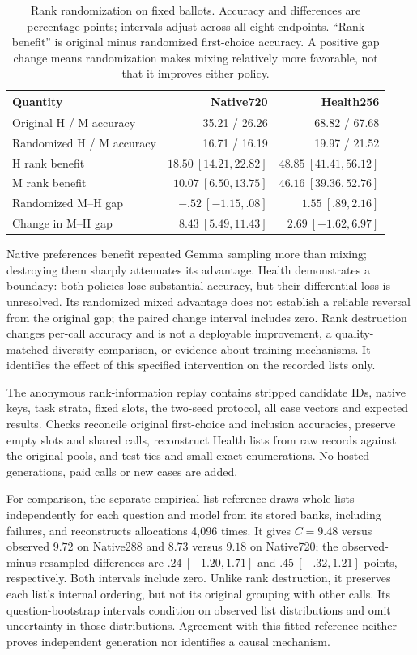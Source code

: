 \begin{table}[h]
\centering\small
\caption{Rank randomization on fixed ballots. Accuracy and differences are percentage points; intervals adjust across all eight endpoints. ``Rank benefit'' is original minus randomized first-choice accuracy. A positive gap change means randomization makes mixing relatively more favorable, not that it improves either policy.}
\label{tab:rank_information}
\begin{tabular}{lrr}
\toprule
Quantity & Native720 & Health256\\
\midrule
Original H / M accuracy &35.21 / 26.26&68.82 / 67.68\\
Randomized H / M accuracy &16.71 / 16.19&19.97 / 21.52\\
H rank benefit & $18.50\ [14.21,22.82]$ & $48.85\ [41.41,56.12]$\\
M rank benefit & $10.07\ [6.50,13.75]$ & $46.16\ [39.36,52.76]$\\
Randomized M--H gap & $-.52\ [-1.15,.08]$ & $1.55\ [.89,2.16]$\\
Change in M--H gap & $8.43\ [5.49,11.43]$ & $2.69\ [-1.62,6.97]$\\
\bottomrule
\end{tabular}
\end{table}

Native preferences benefit repeated Gemma sampling more than mixing; destroying them sharply attenuates its advantage. Health demonstrates a boundary: both policies lose substantial accuracy, but their differential loss is unresolved. Its randomized mixed advantage does not establish a reliable reversal from the original gap; the paired change interval includes zero. Rank destruction changes per-call accuracy and is not a deployable improvement, a quality-matched diversity comparison, or evidence about training mechanisms. It identifies the effect of this specified intervention on the recorded lists only.

The anonymous rank-information replay contains stripped candidate IDs, native keys, task strata, fixed slots, the two-seed protocol, all case vectors and expected results. Checks reconcile original first-choice and inclusion accuracies, preserve empty slots and shared calls, reconstruct Health lists from raw records against the original pools, and test ties and small exact enumerations. No hosted generations, paid calls or new cases are added.

For comparison, the separate empirical-list reference draws whole lists independently for each question and model from its stored banks, including failures, and reconstructs allocations 4,096 times. It gives $C=9.48$ versus observed $9.72$ on Native288 and $8.73$ versus $9.18$ on Native720; the observed-minus-resampled differences are $.24\ [-1.20,1.71]$ and $.45\ [-.32,1.21]$ points, respectively. Both intervals include zero. Unlike rank destruction, it preserves each list's internal ordering, but not its original grouping with other calls. Its question-bootstrap intervals condition on observed list distributions and omit uncertainty in those distributions. Agreement with this fitted reference neither proves independent generation nor identifies a causal mechanism.

